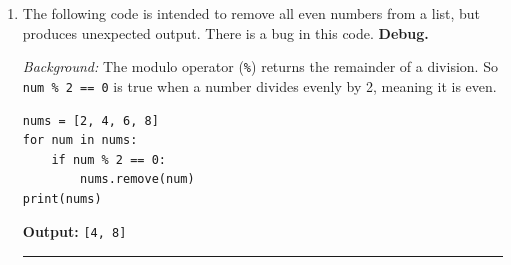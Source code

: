 \documentclass[12pt]{article}
\begin{document}
\begin{enumerate}[leftmargin=*, label=\arabic*., itemsep=2em]
\begin{enumerate}[label=(\alph*), itemsep=1.5em]
        \noindent\textbf{Expected output:}
        \begin{lstlisting}
30
60
90
        \end{lstlisting}

        \vspace{1em}
        \noindent\rule{\linewidth}{0.4pt}

        \item An AI provided code to print every third item from the list above, but when you test it using the same list the output is:

        \begin{lstlisting}
40
70
        \end{lstlisting}

        \noindent \textbf{Debug.}

        \vspace{1em}
        \noindent\rule{\linewidth}{0.4pt}

    \end{enumerate}

    \item The following code is intended to remove all even numbers from a list, but produces unexpected output. There is a bug in this code. \textbf{Debug.}

    \smallskip
    \noindent\textit{Background:} The modulo operator (\texttt{\%}) returns the remainder of a division. So \texttt{num \% 2 == 0} is true when a number divides evenly by 2, meaning it is even.

    \begin{lstlisting}
nums = [2, 4, 6, 8]
for num in nums:
    if num % 2 == 0:
        nums.remove(num)
print(nums)
    \end{lstlisting}

    \noindent\textbf{Output:} \texttt{[4, 8]}

    \vspace{1.5em}
    \noindent\rule{\linewidth}{0.4pt}

\end{enumerate}
\end{document}

